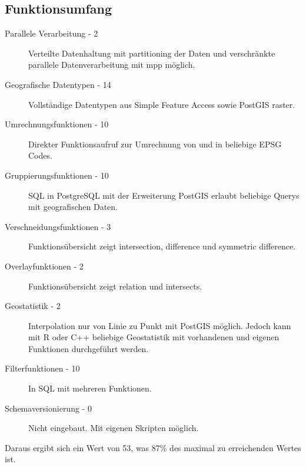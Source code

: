 \subsection{Funktionsumfang}
\begin{description}
\item[Parallele Verarbeitung - 2] Verteilte Datenhaltung mit partitioning der Daten und verschränkte parallele Datenverarbeitung mit \Gls{mpp} möglich. \cite{website:postgresxl-overview}
\item[Geografische Datentypen - 14] Vollständige Datentypen aus Simple Feature Access sowie PostGIS raster. \cite{website:postgisdocu-opengis}
\item[Umrechnungsfunktionen - 10] Direkter Funktionsaufruf zur Umrechnung von und in beliebige EPSG Codes. \cite{website:postgis-updatesrid} %
\item[Gruppierungsfunktionen - 10] SQL in PostgreSQL mit der Erweiterung PostGIS erlaubt beliebige Querys mit geografischen Daten. \cite{website:postgisdocu-opengis}
\item[Verschneidungsfunktionen - 3] Funktionsübersicht zeigt intersection, difference und symmetric difference. \cite{website:postgisdocu-functions}
\item[Overlayfunktionen - 2] Funktionsübersicht zeigt relation und intersects. \cite{website:postgisdocu-functions}
\item[Geostatistik - 2] Interpolation nur von Linie zu Punkt mit PostGIS möglich. Jedoch kann mit R oder C++ beliebige Geostatistik mit vorhandenen und eigenen Funktionen durchgeführt werden.
\item[Filterfunktionen - 10] In SQL mit mehreren Funktionen. \cite{website:postgisdocu-functions}
\item[Schemaversionierung - 0] Nicht eingebaut. Mit eigenen Skripten möglich.
\end{description}
Daraus ergibt sich ein Wert von 53, was 87\% des maximal zu erreichenden Wertes ist.

